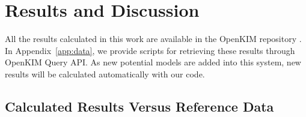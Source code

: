 \documentclass[%
 reprint,
 amsmath,amssymb,
 aps,
]{revtex4-1}
\begin{document}
\section{\label{sec:results}Results and Discussion}

All the results calculated in this work are available in the OpenKIM repository \cite{openkim2016}.
In Appendix~\ref{app:data}, we provide scripts for retrieving these results through OpenKIM Query API.
As new potential models are added into this system, new results will be calculated automatically with our code.

\subsection{\label{sec:calcvsref}Calculated Results Versus Reference Data}
\end{document}
